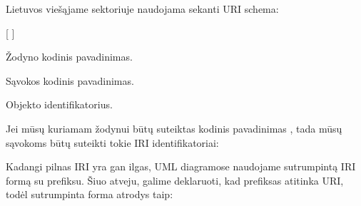 \documentclass[letterpaper,10pt,lithuanian]{sphinxmanual}
\begin{document}
\sphinxAtStartPar
{} \sphinxcode{\sphinxupquote{://}}  \sphinxcode{\sphinxupquote{/}}    \sphinxcode{\sphinxupquote{\#}} 

\sphinxAtStartPar
Lietuvos viešąjame sektoriuje naudojama sekanti URI schema:

\sphinxAtStartPar
{}  \sphinxcode{\sphinxupquote{/}}  {[} \sphinxcode{\sphinxupquote{/}}  {]}
\begin{description}
\sphinxAtStartPar
Žodyno kodinis pavadinimas.

\sphinxAtStartPar
Sąvokos kodinis pavadinimas.

\sphinxAtStartPar
Objekto identifikatorius.

\end{description}

\sphinxAtStartPar
Jei mūsų kuriamam žodynui būtų suteiktas kodinis pavadinimas , tada
mūsų sąvokoms būtų suteikti tokie IRI identifikatoriai:

\begin{sphinxVerbatim}[commandchars=\\\{\}]
\end{sphinxVerbatim}

\sphinxAtStartPar
Kadangi pilnas IRI yra gan ilgas, UML diagramose naudojame sutrumpintą IRI
formą su prefiksu. Šiuo atveju, galime deklaruoti, kad  prefiksas atitinka
 URI, todėl sutrumpinta forma atrodys taip:

\begin{sphinxVerbatim}[commandchars=\\\{\}]

\end{sphinxVerbatim}
\end{document}
